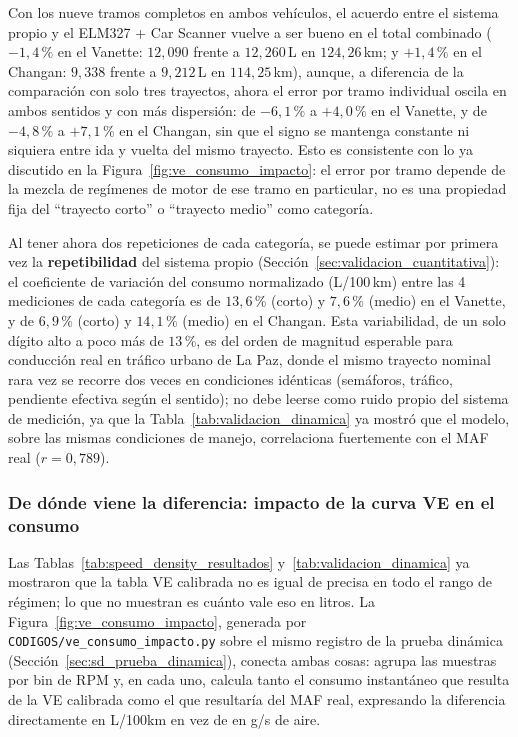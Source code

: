 Con los nueve tramos completos en ambos vehículos, el acuerdo entre el sistema propio y el ELM327 + Car Scanner vuelve a ser bueno en el total combinado ($-1{,}4\,\%$ en el Vanette: $12{,}090$ frente a $12{,}260$\,L en $124{,}26$\,km; y $+1{,}4\,\%$ en el Changan: $9{,}338$ frente a $9{,}212$\,L en $114{,}25$\,km), aunque, a diferencia de la comparación con solo tres trayectos, ahora el error por tramo individual oscila en ambos sentidos y con más dispersión: de $-6{,}1\,\%$ a $+4{,}0\,\%$ en el Vanette, y de $-4{,}8\,\%$ a $+7{,}1\,\%$ en el Changan, sin que el signo se mantenga constante ni siquiera entre ida y vuelta del mismo trayecto. Esto es consistente con lo ya discutido en la Figura~\ref{fig:ve_consumo_impacto}: el error por tramo depende de la mezcla de regímenes de motor de ese tramo en particular, no es una propiedad fija del ``trayecto corto'' o ``trayecto medio'' como categoría.

Al tener ahora dos repeticiones de cada categoría, se puede estimar por primera vez la \textbf{repetibilidad} del sistema propio (Sección~\ref{sec:validacion_cuantitativa}): el coeficiente de variación del consumo normalizado (L/100\,km) entre las 4 mediciones de cada categoría es de $13{,}6\,\%$ (corto) y $7{,}6\,\%$ (medio) en el Vanette, y de $6{,}9\,\%$ (corto) y $14{,}1\,\%$ (medio) en el Changan. Esta variabilidad, de un solo dígito alto a poco más de $13\,\%$, es del orden de magnitud esperable para conducción real en tráfico urbano de La Paz, donde el mismo trayecto nominal rara vez se recorre dos veces en condiciones idénticas (semáforos, tráfico, pendiente efectiva según el sentido); no debe leerse como ruido propio del sistema de medición, ya que la Tabla~\ref{tab:validacion_dinamica} ya mostró que el modelo, sobre las mismas condiciones de manejo, correlaciona fuertemente con el MAF real ($r=0{,}789$).

\subsubsection*{De dónde viene la diferencia: impacto de la curva VE en el consumo}

Las Tablas~\ref{tab:speed_density_resultados} y~\ref{tab:validacion_dinamica} ya mostraron que la tabla VE calibrada no es igual de precisa en todo el rango de régimen; lo que no muestran es cuánto vale eso en litros. La Figura~\ref{fig:ve_consumo_impacto}, generada por \texttt{CODIGOS/ve\_consumo\_impacto.py} sobre el mismo registro de la prueba dinámica (Sección~\ref{sec:sd_prueba_dinamica}), conecta ambas cosas: agrupa las muestras por bin de RPM y, en cada uno, calcula tanto el consumo instantáneo que resulta de la VE calibrada como el que resultaría del MAF real, expresando la diferencia directamente en L/100km en vez de en g/s de aire.

